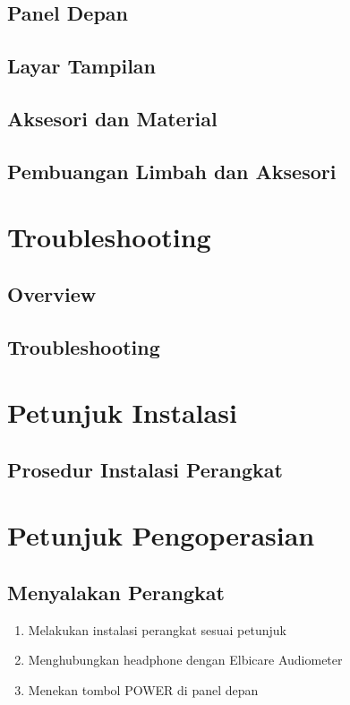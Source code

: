 \documentclass[11pt,a4paper,twoside,draft,onecolumn]{book}
\begin{document}
		\section{Panel Depan}
		
		\section{Layar Tampilan}
		
		\section{Aksesori dan Material}
		
		\section{Pembuangan Limbah dan Aksesori}
		
	\newpage
	
	\chapter{Troubleshooting}
		\section{Overview}
		\section{Troubleshooting}
	\newpage
	
	\chapter{Petunjuk Instalasi}
		\section{Prosedur Instalasi Perangkat}
	\newpage
	
	\chapter{Petunjuk Pengoperasian}
		\section{Menyalakan Perangkat}
		\begin{enumerate}
			\item Melakukan instalasi perangkat sesuai petunjuk
			\item Menghubungkan headphone dengan Elbicare Audiometer
			\item Menekan tombol POWER di panel depan
		\end{enumerate}
	
\end{document}
